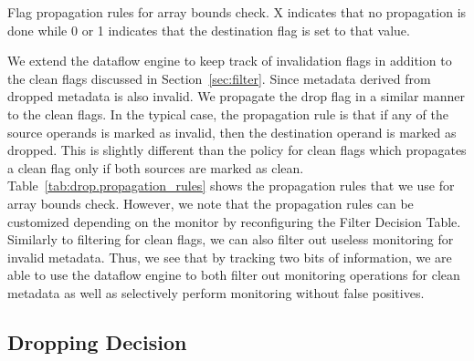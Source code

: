 \begin{table}[tb]
  \begin{center}
    \begin{small}
    
    \end{small}
    \caption{Flag propagation rules for array bounds check. X indicates that no
    propagation is done while 0 or 1 indicates that the destination flag is set
    to that value.}
    \label{tab:drop.propagation_rules}
    \vspace{-0.2in}
  \end{center}
\end{table}

We extend the dataflow engine to keep track of invalidation flags in addition
to the clean flags discussed in Section~\ref{sec:filter}.
Since metadata derived from dropped metadata is also invalid. We propagate the
drop flag in a similar manner to the clean flags.  In the typical case, the
propagation rule is
that if any of the source operands is marked as invalid, then the destination
operand is marked as dropped. This is slightly different than the
policy for clean flags which propagates a clean flag only if both
sources are marked as clean. Table~\ref{tab:drop.propagation_rules} shows the
propagation rules that we use for array bounds check.  However, we note that
the propagation rules can be customized depending on the monitor by
reconfiguring the Filter Decision Table.
Similarly to filtering for clean flags, we can also filter out
useless monitoring for invalid metadata.
Thus, we see that by tracking two bits of information, we are able to use the
dataflow engine to both filter out monitoring operations for clean metadata as
well as selectively perform monitoring without false positives.

\subsection{Dropping Decision}

